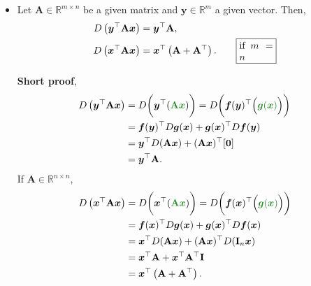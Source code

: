 \documentclass[12pt,thmsa]{article}
\begin{document}
\begin{itemize}
	\item Let \(\mathbf{A} \in \mathbb{R}^{m \times n}\) be a given matrix and \(\boldsymbol{y} \in \mathbb{R}^{m}\) a given vector. Then,
	\begin{align*}
		D\left(\boldsymbol{y}^{\top} \mathbf{A} \boldsymbol{x}\right) &=
		\boldsymbol{y}^{\top} \mathbf{A}, \\
		D\left(\boldsymbol{x}^{\top} \mathbf{A} \boldsymbol{x}\right) &=
		\boldsymbol{x}^{\top}\left(\mathbf{A}+\mathbf{A}^{\top}\right).  \qquad
		\fbox{\parbox{0.1\textwidth}{ if \(m=n\) }}
	\end{align*}
	
	\textbf{Short proof},
	\[\begin{aligned}    
		D\left(\boldsymbol{y}^{\top} \mathbf{A} \boldsymbol{x}\right) 
		&=D \bigg ( \boldsymbol{y}^{\top}( {\color{forestgreen}{\mathbf{A} \boldsymbol{x}}} ) \bigg )
		=D \bigg ( \boldsymbol{f}(\boldsymbol{y})^{\top} \Big( {\color{forestgreen}{\boldsymbol{g}(\boldsymbol{x})}} \Big) \bigg ) \\    
		&=\boldsymbol{f}(\boldsymbol{y})^{\top} D \boldsymbol{g} (\boldsymbol{x})
		+\boldsymbol{g}(\boldsymbol{x})^{\top} D \boldsymbol{f}(\boldsymbol{y}) \\    
		&=\boldsymbol{y}^{\top} D(\mathbf{A} \boldsymbol{x})+(\mathbf{A} \boldsymbol{x})^{\top}[\mathbf{0}] \\
		&=\boldsymbol{y}^{\top} \mathbf{A}.
	\end{aligned}\]
	If \(\mathbf{A} \in \mathbb{R}^{n \times n}\),
	\[ \begin{aligned}    
		D\left(\boldsymbol{x}^{\top} \mathbf{A} \boldsymbol{x}\right)    
		&=D \bigg( \boldsymbol{x}^{\top}( {\color{forestgreen}{\mathbf{A} \boldsymbol{x}}} ) \bigg)
		=D\bigg(\boldsymbol{f}(\boldsymbol{x})^{\top} \Big( {\color{forestgreen}{\boldsymbol{g}(\boldsymbol{x})}} \Big ) \bigg) \\     
		&=\boldsymbol{f}(\boldsymbol{x})^{\top} D \boldsymbol{g} (\boldsymbol{x})+\boldsymbol{g}(\boldsymbol{x})^{\top} D \boldsymbol{f}(\boldsymbol{x}) \\    
		&=\boldsymbol{x}^{\top} D(\mathbf{A} \boldsymbol{x})+(\mathbf{A} \boldsymbol{x})^{\top} D(\mathbf{I}_{n} \boldsymbol{x}) \\    
		&=\boldsymbol{x}^{\top} \mathbf{A}+\boldsymbol{x}^{\top} \mathbf{A}^{\top} \mathbf{I}  \\
		&=\boldsymbol{x}^{\top} \left(\mathbf{A}+\mathbf{A}^{\top}\right).
	\end{aligned} \]


\end{itemize}
\end{document}
